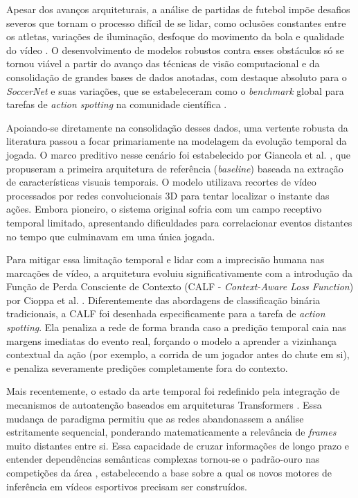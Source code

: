 \documentclass[a4paper,10pt, twocolumn]{article}
\begin{document}
Apesar dos avanços arquiteturais, a análise de partidas de futebol impõe desafios severos que tornam o processo difícil de se lidar, como oclusões constantes entre os atletas, variações de iluminação, desfoque do movimento da bola e qualidade do vídeo \cite{karimi2021soccer, chaganti2024advanced}. O desenvolvimento de modelos robustos contra esses obstáculos só se tornou viável a partir do avanço das técnicas de visão computacional e da consolidação de grandes bases de dados anotadas, com destaque absoluto para o \textit{SoccerNet} e suas variações, que se estabeleceram como o \textit{benchmark} global para tarefas de \textit{action spotting} na comunidade científica \cite{deliege2021soccernet, seweryn2026survey}.

Apoiando-se diretamente na consolidação desses dados, uma vertente robusta da literatura passou a focar primariamente na modelagem da evolução temporal da jogada. O marco preditivo nesse cenário foi estabelecido por Giancola et al. \cite{giancola2018soccernet}, que propuseram a primeira arquitetura de referência (\textit{baseline}) baseada na extração de características visuais temporais. O modelo utilizava recortes de vídeo processados por redes convolucionais 3D para tentar localizar o instante das ações. Embora pioneiro, o sistema original sofria com um campo receptivo temporal limitado, apresentando dificuldades para correlacionar eventos distantes no tempo que culminavam em uma única jogada.

Para mitigar essa limitação temporal e lidar com a imprecisão humana nas marcações de vídeo, a arquitetura evoluiu significativamente com a introdução da Função de Perda Consciente de Contexto (CALF - \textit{Context-Aware Loss Function}) por Cioppa et al. \cite{cioppa2020context}. Diferentemente das abordagens de classificação binária tradicionais, a CALF foi desenhada especificamente para a tarefa de \textit{action spotting}. Ela penaliza a rede de forma branda caso a predição temporal caia nas margens imediatas do evento real, forçando o modelo a aprender a vizinhança contextual da ação (por exemplo, a corrida de um jogador antes do chute em si), e penaliza severamente predições completamente fora do contexto.

Mais recentemente, o estado da arte temporal foi redefinido pela integração de mecanismos de autoatenção baseados em arquiteturas Transformers \cite{zhou2021feature, giancola2025deep}. Essa mudança de paradigma permitiu que as redes abandonassem a análise estritamente sequencial, ponderando matematicamente a relevância de \textit{frames} muito distantes entre si. Essa capacidade de cruzar informações de longo prazo e entender dependências semânticas complexas tornou-se o padrão-ouro nas competições da área \cite{giancola2022soccernet, cioppa2024soccernet}, estabelecendo a base sobre a qual os novos motores de inferência em vídeos esportivos precisam ser construídos.
\end{document}
